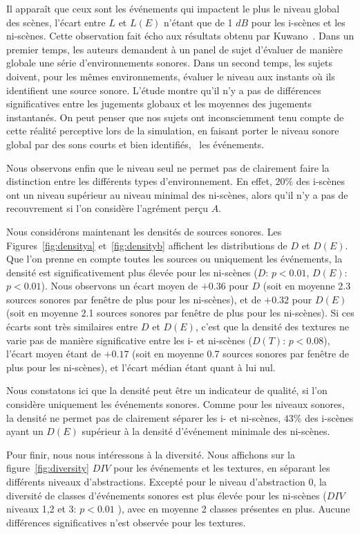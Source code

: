 Il apparaît que ceux sont les événements qui impactent le plus le niveau global des scènes, l'écart entre $L$ et $L(E)$ n'étant que de 1 $dB$ pour les i-scènes et les ni-scènes. Cette observation fait écho aux résultats obtenu par Kuwano~\al \citep{kuwano_memory_2003}. Dans un premier temps, les auteurs demandent à un panel de sujet d'évaluer de manière globale une série d'environnements sonores. Dans un second temps, les sujets doivent, pour les mêmes environnements, évaluer le niveau aux instants où ils identifient une source sonore. L'étude montre qu'il n'y a pas de différences significatives entre les jugements globaux et les moyennes des jugements instantanés. On peut penser que nos sujets ont inconsciemment tenu compte de cette réalité perceptive lors de la simulation, en faisant porter le niveau sonore global par des sons courts et bien identifiés, \ie~les événements.

Nous observons enfin que le niveau seul ne permet pas de clairement faire la distinction entre les différents types d'environnement. En effet,  $20\%$ des i-scènes ont un niveau supérieur au niveau minimal des ni-scènes, alors qu'il n'y a pas de recouvrement si l'on considère l'agrément perçu $A$.

Nous considérons maintenant les densités de sources sonores. Les Figures~\ref{fig:densitya} et~\ref{fig:densityb} affichent les distributions de $D$ et $D(E)$. Que l'on prenne en compte toutes les sources ou uniquement les événements, la densité est significativement plus élevée pour les ni-scènes ($D$: $p<0.01$, $D(E)$: $p<0.01$). Nous observons un écart moyen de $+0.36$ pour $D$ (soit en moyenne 2.3 sources sonores par fenêtre de plus pour les ni-scènes), et de $+0.32$ pour $D(E)$ (soit en moyenne 2.1 sources sonores par fenêtre de plus pour les ni-scènes). Si ces écarts sont très similaires entre $D$ et $D(E)$, c'est que la densité des textures ne varie pas de manière significative entre les i- et ni-scènes ($D(T)$: $p<0.08$), l'écart moyen étant de $+0.17$ (soit en moyenne 0.7 sources sonores par fenêtre de plus pour les ni-scènes), et l'écart médian étant quant à lui nul.

Nous constatons ici que la densité peut être un indicateur de qualité, si l'on considère uniquement les événements sonores. Comme pour les niveaux sonores, la densité ne permet pas de clairement séparer les i- et ni-scènes,  $43\%$ des i-scènes ayant un $D(E)$ supérieur à la densité d'événement minimale des ni-scènes.

Pour finir, nous nous intéressons à la diversité. Nous affichons sur la figure~\ref{fig:diversity} $DIV$ pour les événements et les textures, en séparant les différents niveaux d'abstractions. Excepté pour le niveau d'abstraction 0, la diversité de classes d'événements sonores est plus élevée pour les ni-scènes ($DIV$ niveaux 1,2 et 3: $p<0.01$ ), avec en moyenne 2 classes présentes en plus. Aucune différences significatives n'est observée pour les textures.

